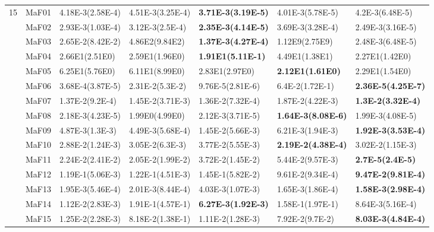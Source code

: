 \documentclass[]{article}
\begin{document}
\begin{landscape}
\begin{table}
\begin{footnotesize}
\begin{tabular}{|l|l|l|l|l|l|l|}
\multirow{15}{*}{15} & MaF01 & 4.18E-3(2.58E-4) & 4.51E-3(3.25E-4) & \cellcolor{gray95} {\bf 3.71E-3(3.19E-5)} & 4.01E-3(5.78E-5) & 4.2E-3(6.48E-5)\\
 & MaF02 & 2.93E-3(1.03E-4) & 3.12E-3(2.5E-4) & \cellcolor{gray95} {\bf 2.35E-3(4.14E-5)} & 3.69E-3(3.28E-4) & \cellcolor{gray95} 2.49E-3(3.16E-5)\\
 & MaF03 & 2.65E-2(8.42E-2) & 4.86E2(9.84E2) & \cellcolor{gray95} {\bf 1.37E-3(4.27E-4)} & 1.12E9(2.75E9) & 2.48E-3(6.48E-5)\\
 & MaF04 & 2.66E1(2.51E0) & 2.59E1(1.96E0) & \cellcolor{gray95} {\bf 1.91E1(5.11E-1)} & 4.49E1(1.38E1) & \cellcolor{gray95} 2.27E1(1.42E0)\\
 & MaF05 & 6.25E1(5.76E0) & 6.11E1(8.99E0) & 2.83E1(2.97E0) & \cellcolor{gray95} {\bf 2.12E1(1.61E0)} & \cellcolor{gray95} 2.29E1(1.54E0)\\
 & MaF06 & 3.68E-4(3.87E-5) & 2.31E-2(5.3E-2) & \cellcolor{gray95} 9.76E-5(2.81E-6) & 6.4E-2(1.72E-1) & \cellcolor{gray95} {\bf 2.36E-5(4.25E-7)}\\
 & MaF07 & 1.37E-2(9.2E-4) & \cellcolor{gray95} 1.45E-2(3.71E-3) & 1.36E-2(7.32E-4) & 1.87E-2(4.22E-3) & \cellcolor{gray95} {\bf 1.3E-2(3.32E-4)}\\
 & MaF08 & 2.18E-3(4.23E-5) & 1.99E0(4.99E0) & 2.12E-3(3.71E-5) & \cellcolor{gray95} {\bf 1.64E-3(8.08E-6)} & \cellcolor{gray95} 1.99E-3(4.08E-5)\\
 & MaF09 & 4.87E-3(1.3E-3) & 4.49E-3(5.68E-4) & 1.45E-2(5.66E-3) & 6.21E-3(1.94E-3) & \cellcolor{gray95} {\bf 1.92E-3(3.53E-4)}\\
 & MaF10 & 2.88E-2(1.24E-3) & 3.05E-2(6.3E-3) & 3.77E-2(5.55E-3) & \cellcolor{gray95} {\bf 2.19E-2(4.38E-4)} & 3.02E-2(1.15E-3)\\
 & MaF11 & 2.24E-2(2.41E-2) & 2.05E-2(1.99E-2) & 3.72E-2(1.45E-2) & 5.44E-2(9.57E-3) & \cellcolor{gray95} {\bf 2.7E-5(2.4E-5)}\\
 & MaF12 & 1.19E-1(5.06E-3) & 1.22E-1(4.51E-3) & 1.45E-1(5.82E-2) & \cellcolor{gray95} 9.61E-2(9.34E-4) & \cellcolor{gray95} {\bf 9.47E-2(9.81E-4)}\\
 & MaF13 & 1.95E-3(5.46E-4) & 2.01E-3(8.44E-4) & 4.03E-3(1.07E-3) & \cellcolor{gray95} 1.65E-3(1.86E-4) & \cellcolor{gray95} {\bf 1.58E-3(2.98E-4)}\\
 & MaF14 & 1.12E-2(2.83E-3) & 1.91E-1(4.57E-1) & \cellcolor{gray95} {\bf 6.27E-3(1.92E-3)} & 1.58E-1(1.97E-1) & \cellcolor{gray95} 8.64E-3(5.16E-4)\\
 & MaF15 & 1.25E-2(2.28E-3) & 8.18E-2(1.38E-1) & 1.11E-2(1.28E-3) & 7.92E-2(9.7E-2) & \cellcolor{gray95} {\bf 8.03E-3(4.84E-4)}\\
\hline
\end{tabular}
\end{footnotesize}
\end{table}
\end{landscape}
\end{document}
